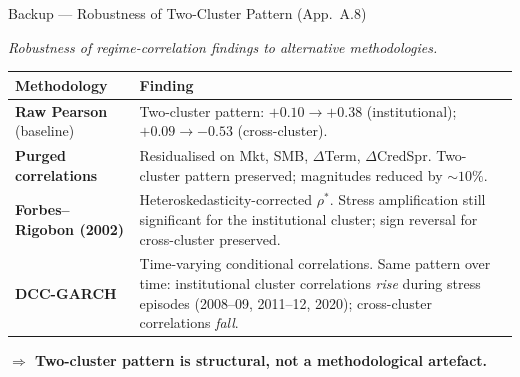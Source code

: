 \documentclass[aspectratio=169,11pt]{beamer}
\newcommand{\hlt}[1]{\textcolor{edhecred}{\textbf{#1}}}     %
\begin{document}
\begin{frame}[t]{Backup --- Robustness of Two-Cluster Pattern (App.\ A.8)}
\centering
\scriptsize
\vspace{0.10cm}

\textit{Robustness of regime-correlation findings to alternative methodologies.}

\vspace{0.30cm}
\renewcommand{\arraystretch}{1.30}
\setlength{\tabcolsep}{6pt}

\begin{tabular}{p{4.5cm}p{8.5cm}}
\toprule
\textbf{Methodology}                   & \textbf{Finding} \\
\midrule
\textbf{Raw Pearson} (baseline)        & Two-cluster pattern: $+0.10 \to +0.38$ (institutional);
                                          $+0.09 \to -0.53$ (cross-cluster). \\
\textbf{Purged correlations}           & Residualised on Mkt, SMB, $\Delta$Term, $\Delta$CredSpr.
                                          Two-cluster pattern preserved; magnitudes reduced
                                          by $\sim 10\%$. \\
\textbf{Forbes--Rigobon (2002)}        & Heteroskedasticity-corrected $\rho^*$.
                                          Stress amplification still significant for the institutional cluster;
                                          sign reversal for cross-cluster preserved. \\
\textbf{DCC-GARCH}                     & Time-varying conditional correlations. Same pattern over time:
                                          institutional cluster correlations \emph{rise} during stress episodes
                                          (2008--09, 2011--12, 2020); cross-cluster correlations \emph{fall}. \\
\bottomrule
\end{tabular}

\vspace{0.40cm}

\centering
\hlt{$\Rightarrow$ Two-cluster pattern is structural, not a methodological artefact.}

\end{frame}
\end{document}
